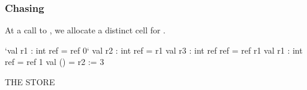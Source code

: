 \documentclass[aspectratio=169, handout]{beamer}
\newcommand{\topthing}[2]{
      \begin{minipage}[t][#1][t]{\textwidth}
        \vspace{\fill}
        #2
        \vspace{\fill}
      \end{minipage}
    }
\begin{document}
\begin{frame}[fragile]
  \frametitle{ Chasing}

  \topthing{0.2in}{
    At a call to \code{ref}, we allocate a distinct \code{ref} cell for \code{r1}.
  }

  \vspace{10pt}

  \begin{center}
    \begin{minipage}[t][2.1in][t]{0.6\textwidth}
      \vspace{\fill}
      \begin{codeblock}
        `val r1 : int ref     = ref 0`
        val r2 : int ref     = r1
        val r3 : int ref ref = ref r1
        val r1 : int ref     = ref 1
        val ()               = r2 := 3
      \end{codeblock}
      \vspace{\fill}
    \end{minipage}
    \hfill\vline\hfill
    \begin{minipage}[t][2.1in][t]{0.3\textwidth}
      \centering
      {\hspace{-20pt}\color{gray} \large THE STORE}

      \vspace{\fill}
      \vspace{\fill}
    \end{minipage}
  \end{center}
\end{frame}
\end{document}
